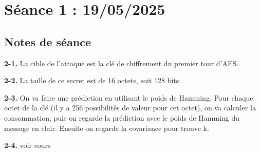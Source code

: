 \documentclass[12pt]{article}
\begin{document}
	\section{Séance 1 : 19/05/2025}
	\subsection{Notes de séance}
	
	\textbf{2-1.} La cible de l'attaque est la clé de chiffrement du premier tour d'AES.
	
	\noindent \textbf{2-2.} La taille de ce secret est de 16 octets, soit 128 bits.
	
	\noindent \textbf{2-3.} On va faire une prédiction en utilisant le poids de Hamming. Pour chaque octet de la clé (il y a 256 possibilités de valeur pour cet octet), on va calculer la consommation, puis on regarde la prédiction avec le poids de Hamming du message en clair. Ensuite on regarde la covariance pour trouve k.
	
	\noindent \textbf{2-4.} voir cours
	
\end{document}
